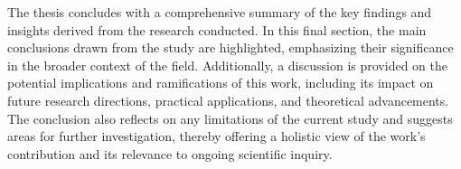 \documentclass[main.tex]{subfiles}
\begin{document}
    The thesis concludes with a comprehensive summary of the key findings and insights derived from the research conducted. In this final section, the main conclusions drawn from the study are highlighted, emphasizing their significance in the broader context of the field. Additionally, a discussion is provided on the potential implications and ramifications of this work, including its impact on future research directions, practical applications, and theoretical advancements. The conclusion also reflects on any limitations of the current study and suggests areas for further investigation, thereby offering a holistic view of the work's contribution and its relevance to ongoing scientific inquiry.



    


    

 
\end{document}
